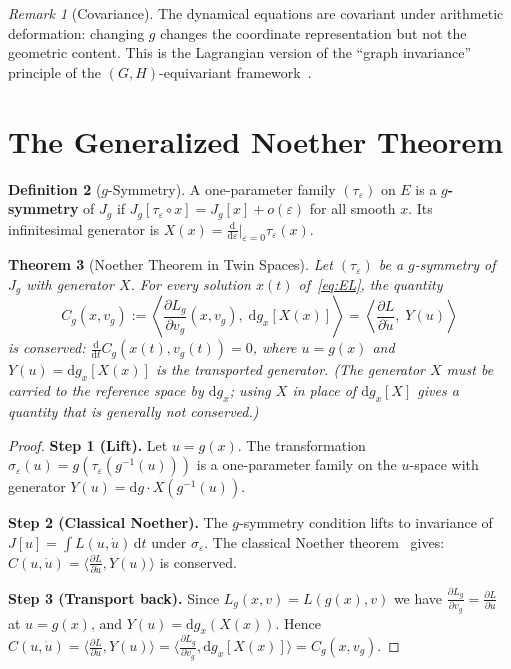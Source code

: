 \documentclass[11pt,twocolumn]{article}
\theoremstyle{plain}
\newtheorem{theorem}{Theorem}
\theoremstyle{definition}
\newtheorem{definition}[theorem]{Definition}
\theoremstyle{remark}
\newtheorem{remark}[theorem]{Remark}
\newcommand{\dd}{\mathrm{d}}
\begin{document}
\begin{remark}[Covariance]
The dynamical equations are covariant under arithmetic deformation: changing $g$ changes the coordinate representation but not the geometric content. This is the Lagrangian version of the ``graph invariance'' principle of the $(G,H)$-equivariant framework~\cite{nembe2026vol17}.
\end{remark}


\section{The Generalized Noether Theorem}
\label{sec:noether}

\begin{definition}[$g$-Symmetry]\label{def:g-sym}
A one-parameter family $(\tau_\varepsilon)$ on $E$ is a \textbf{$g$-symmetry} of $J_g$ if $J_g[\tau_\varepsilon \circ x] = J_g[x] + o(\varepsilon)$ for all smooth $x$. Its infinitesimal generator is $X(x) = \frac{\dd}{\dd\varepsilon}|_{\varepsilon=0}\tau_\varepsilon(x)$.
\end{definition}

\begin{theorem}[Noether Theorem in Twin Spaces]\label{thm:noether}
Let $(\tau_\varepsilon)$ be a $g$-symmetry of $J_g$ with generator $X$. For every solution $x(t)$ of~\eqref{eq:EL}, the quantity
\begin{equation}
\boxed{C_g(x, v_g) := \left\langle\frac{\partial L_g}{\partial v_g}(x, v_g),\; \dd g_x[X(x)]\right\rangle = \left\langle\frac{\partial L}{\partial \dot{u}},\; Y(u)\right\rangle}
\end{equation}
is conserved: $\frac{\dd}{\dd t}C_g(x(t), v_g(t)) = 0$, where $u = g(x)$ and $Y(u) = \dd g_x[X(x)]$ is the transported generator. (The generator $X$ must be carried to the reference space by $\dd g_x$; using $X$ in place of $\dd g_x[X]$ gives a quantity that is generally \emph{not} conserved.)
\end{theorem}

\begin{proof}
\textbf{Step 1 (Lift).} Let $u = g(x)$. The transformation $\sigma_\varepsilon(u) = g(\tau_\varepsilon(g^{-1}(u)))$ is a one-parameter family on the $u$-space with generator $Y(u) = \dd g \cdot X(g^{-1}(u))$.

\textbf{Step 2 (Classical Noether).} The $g$-symmetry condition lifts to invariance of $J[u] = \int L(u, \dot{u})\,\dd t$ under $\sigma_\varepsilon$. The classical Noether theorem~\cite{olver1993} gives: $C(u, \dot{u}) = \langle\frac{\partial L}{\partial\dot{u}}, Y(u)\rangle$ is conserved.

\textbf{Step 3 (Transport back).} Since $L_g(x, v) = L(g(x), v)$ we have $\frac{\partial L_g}{\partial v_g} = \frac{\partial L}{\partial\dot{u}}$ at $u = g(x)$, and $Y(u) = \dd g_x(X(x))$. Hence $C(u, \dot{u}) = \langle\frac{\partial L}{\partial\dot{u}}, Y(u)\rangle = \langle\frac{\partial L_g}{\partial v_g}, \dd g_x[X(x)]\rangle = C_g(x, v_g)$.
\end{proof}
\end{document}
